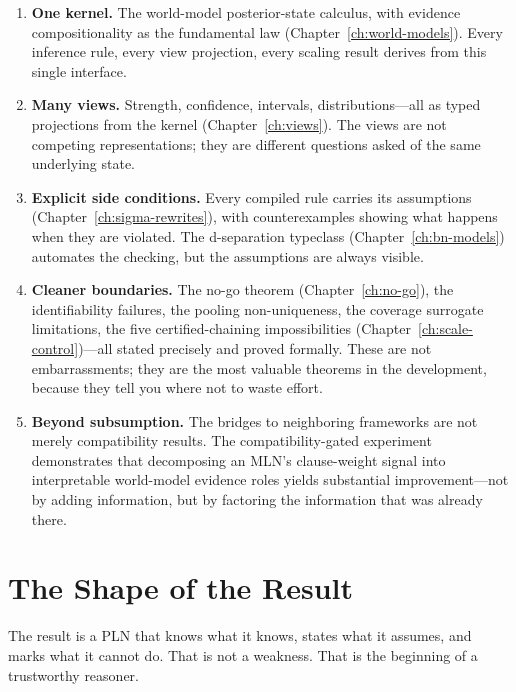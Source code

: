 \begin{enumerate}
\item \textbf{One kernel.}  The world-model posterior-state calculus,
  with evidence compositionality as the fundamental law
  (Chapter~\ref{ch:world-models}).  Every inference rule, every view
  projection, every scaling result derives from this single interface.

\item \textbf{Many views.}  Strength, confidence, intervals,
  distributions---all as typed projections from the kernel
  (Chapter~\ref{ch:views}).  The views are not competing
  representations; they are different questions asked of the same
  underlying state.

\item \textbf{Explicit side conditions.}  Every compiled rule carries
  its assumptions (Chapter~\ref{ch:sigma-rewrites}), with
  counterexamples showing what happens when they are violated.  The
  d-separation typeclass (Chapter~\ref{ch:bn-models}) automates the
  checking, but the assumptions are always visible.

\item \textbf{Cleaner boundaries.}  The no-go theorem
  (Chapter~\ref{ch:no-go}), the identifiability failures, the pooling
  non-uniqueness, the coverage surrogate limitations, the five
  certified-chaining impossibilities
  (Chapter~\ref{ch:scale-control})---all stated precisely and proved
  formally.  These are not embarrassments; they are the most valuable
  theorems in the development, because they tell you where not to
  waste effort.

\item \textbf{Beyond subsumption.}  The bridges to neighboring
  frameworks are not merely compatibility results.  The
  compatibility-gated experiment demonstrates that decomposing an
  MLN's clause-weight signal into interpretable world-model evidence
  roles yields substantial improvement---not by adding information,
  but by factoring the information that was already there.
\end{enumerate}

\section{The Shape of the Result}

The result is a PLN that knows what it knows, states what it assumes,
and marks what it cannot do.  That is not a weakness.  That is the
beginning of a trustworthy reasoner.

